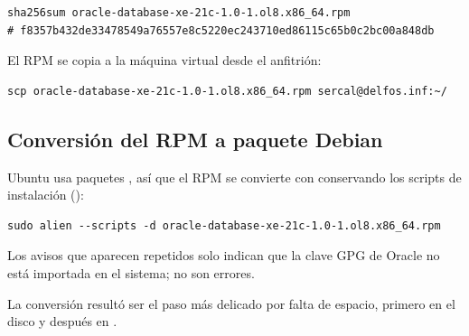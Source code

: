 \begin{lstlisting}[style=bash]
sha256sum oracle-database-xe-21c-1.0-1.ol8.x86_64.rpm
# f8357b432de33478549a76557e8c5220ec243710ed86115c65b0c2bc00a848db
\end{lstlisting}


El RPM se copia a la máquina virtual desde el anfitrión:

\begin{lstlisting}[style=bash]
scp oracle-database-xe-21c-1.0-1.ol8.x86_64.rpm sercal@delfos.inf:~/
\end{lstlisting}


\subsection{Conversión del RPM a paquete Debian}
\label{sec:alien}

Ubuntu usa paquetes , así que el RPM se convierte con 
conservando los scripts de instalación ():

\begin{lstlisting}[style=bash]
sudo alien --scripts -d oracle-database-xe-21c-1.0-1.ol8.x86_64.rpm
\end{lstlisting}

Los avisos  que aparecen repetidos solo indican que la clave GPG de
Oracle no está importada en el sistema; no son errores.


La conversión resultó ser el paso más delicado por falta de espacio, primero en
el disco y después en .

